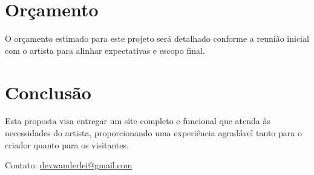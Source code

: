 \documentclass[a4paper,12pt]{article}
\begin{document}
\section*{Orçamento}
O orçamento estimado para este projeto será detalhado conforme a reunião inicial com o artista para alinhar expectativas e escopo final.

\section*{Conclusão}
Esta proposta visa entregar um site completo e funcional que atenda às necessidades do artista, proporcionando uma experiência agradável tanto para o criador quanto para os visitantes.

\vfill
\noindent Contato: \href{mailto:devwanderlei@gmail.com}{devwanderlei@gmail.com} 
\end{document}
